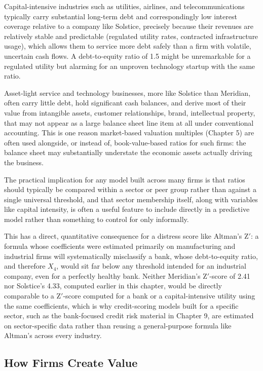 \documentclass[../ai_in_finance]{subfiles}
\begin{document}
Capital-intensive industries such as utilities, airlines, and telecommunications typically carry substantial long-term debt and correspondingly low interest coverage relative to a company like Solstice, precisely because their revenues are relatively stable and predictable (regulated utility rates, contracted infrastructure usage), which allows them to service more debt safely than a firm with volatile, uncertain cash flows. A debt-to-equity ratio of 1.5 might be unremarkable for a regulated utility but alarming for an unproven technology startup with the same ratio.

Asset-light service and technology businesses, more like Solstice than Meridian, often carry little debt, hold significant cash balances, and derive most of their value from intangible assets, customer relationships, brand, intellectual property, that may not appear as a large balance sheet line item at all under conventional accounting. This is one reason market-based valuation multiples (Chapter 5) are often used alongside, or instead of, book-value-based ratios for such firms: the balance sheet may substantially understate the economic assets actually driving the business.

The practical implication for any model built across many firms is that ratios should typically be compared within a sector or peer group rather than against a single universal threshold, and that sector membership itself, along with variables like capital intensity, is often a useful feature to include directly in a predictive model rather than something to control for only informally.

This has a direct, quantitative consequence for a distress score like Altman's Z$'$: a formula whose coefficients were estimated primarily on manufacturing and industrial firms will systematically misclassify a bank, whose debt-to-equity ratio, and therefore $X_4$, would sit far below any threshold intended for an industrial company, even for a perfectly healthy bank. Neither Meridian's Z$'$-score of 2.41 nor Solstice's 4.33, computed earlier in this chapter, would be directly comparable to a Z$'$-score computed for a bank or a capital-intensive utility using the same coefficients, which is why credit-scoring models built for a specific sector, such as the bank-focused credit risk material in Chapter 9, are estimated on sector-specific data rather than reusing a general-purpose formula like Altman's across every industry.

\subsection{How Firms Create Value}
\end{document}
